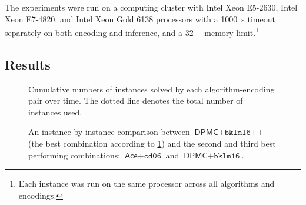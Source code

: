 \documentclass[runningheads]{llncs}
\begin{document}
The experiments were run on a computing cluster with Intel Xeon E5-2630,
Intel Xeon E7-4820, and Intel Xeon Gold 6138 processors with a
\SI{1000}{\second} timeout separately on both encoding and inference, and a
\SI{32}{\gibi\byte} memory limit.\footnote{Each instance was run on the same
  processor across all algorithms and encodings.}

\subsection{Results}

\begin{figure}
  \centering
  \caption{Cumulative numbers of instances solved by each algorithm-encoding
    pair over time. The dotted line denotes the total number of instances used.}
  \label{fig:cumulative}
\end{figure}

\begin{figure}
  \centering
  \caption{An instance-by-instance comparison between $\textsf{DPMC} +
    \texttt{bklm16++}$ (the best combination according to \cref{fig:cumulative})
  and the second and third best performing combinations: $\textsf{Ace} +
  \texttt{cd06}$ and $\textsf{DPMC} + \texttt{bklm16}$.}
  \label{fig:scatter}
\end{figure}
\end{document}
